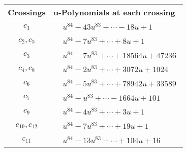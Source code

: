 \documentclass[1p]{elsarticle_modified}
\theoremstyle{definition}
\begin{document}
\begin{tabular}{m{50pt}|m{274pt}}
Crossings & \hspace{64pt}u-Polynomials at each crossing \\
\hline $$\begin{aligned}c_{1}\end{aligned}$$&$\begin{aligned}
&u^{84}+43 u^{83}+\cdots-18 u+1
\end{aligned}$\\
\hline $$\begin{aligned}c_{2},c_{5}\end{aligned}$$&$\begin{aligned}
&u^{84}+7 u^{83}+\cdots+8 u+1
\end{aligned}$\\
\hline $$\begin{aligned}c_{3}\end{aligned}$$&$\begin{aligned}
&u^{84}-7 u^{83}+\cdots+18564 u+47236
\end{aligned}$\\
\hline $$\begin{aligned}c_{4},c_{8}\end{aligned}$$&$\begin{aligned}
&u^{84}+2 u^{83}+\cdots+3072 u+1024
\end{aligned}$\\
\hline $$\begin{aligned}c_{6}\end{aligned}$$&$\begin{aligned}
&u^{84}-5 u^{83}+\cdots+78942 u+33589
\end{aligned}$\\
\hline $$\begin{aligned}c_{7}\end{aligned}$$&$\begin{aligned}
&u^{84}+u^{83}+\cdots-1664 u+101
\end{aligned}$\\
\hline $$\begin{aligned}c_{9}\end{aligned}$$&$\begin{aligned}
&u^{84}+4 u^{83}+\cdots+3 u+1
\end{aligned}$\\
\hline $$\begin{aligned}c_{10},c_{12}\end{aligned}$$&$\begin{aligned}
&u^{84}+7 u^{83}+\cdots+19 u+1
\end{aligned}$\\
\hline $$\begin{aligned}c_{11}\end{aligned}$$&$\begin{aligned}
&u^{84}-13 u^{83}+\cdots+104 u+16
\end{aligned}$\\
\hline
\end{tabular}\\~\\
\end{document}
